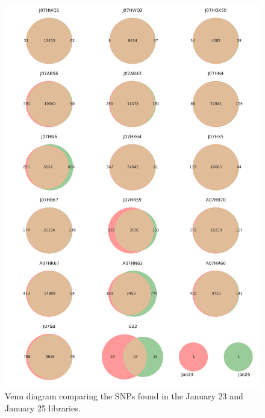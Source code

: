 \begin{figure}[!hbtp]
  \centering
  \includegraphics[width=\textwidth,height=0.9\textheight,keepaspectratio]{Chapter5/Figures/Venn_JanuarySNPs.pdf}
  \caption{Venn diagram comparing the SNPs found in the January 23 and January 25 libraries.}
  \label{VennJan}
\end{figure}

